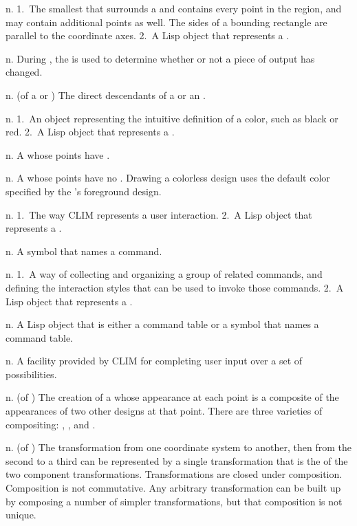 \begin{description}
 {n.} {1.~The smallest  that
surrounds a  and contains every point in the region, and
may contain additional points as well.  The sides of a bounding rectangle are
parallel to the coordinate axes.  2.~A Lisp object that represents a
.}

 {n.} {During , the
 is used to determine whether or not a piece of output has
changed.}

 {n.} {(of a  or ) The
direct descendants of a  or an .}

 {n.} {1.~An object representing the intuitive definition
of a color, such as black or red.  2.~A Lisp object that represents a
.}

 {n.} {A  whose points have
.}

 {n.} {A  whose points have no
.  Drawing a colorless design uses the default color specified by
the 's foreground design.}

 {n.} {1.~The way CLIM represents a user interaction.
2.~A Lisp object that represents a .}

 {n.} {A symbol that names a command.}

 {n.} {1.~A way of collecting and organizing a
group of related commands, and defining the interaction styles that can be used
to invoke those commands.  2.~A Lisp object that represents a .}

 {n.} {A Lisp object that is either a
command table or a symbol that names a command table.}

 {n.} {A facility provided by CLIM for completing
user input over a set of possibilities.}

 {n.} {(of ) The creation of a
 whose appearance at each point is a composite of the appearances
of two other designs at that point.  There are three varieties of compositing:
, , and .}

 {n.} {(of ) The
transformation from one coordinate system to another, then from the second to a
third can be represented by a single transformation that is the
 of the two component transformations.  Transformations are
closed under composition.  Composition is not commutative.  Any arbitrary
transformation can be built up by composing a number of simpler transformations,
but that composition is not unique.}


\end{description}
